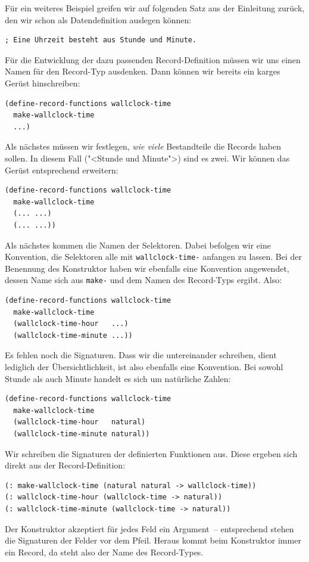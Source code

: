 Für ein weiteres Beispiel greifen wir auf folgenden Satz aus der
Einleitung zurück, den wir schon als Datendefinition auslegen können:
%
\begin{verbatim}
; Eine Uhrzeit besteht aus Stunde und Minute.
\end{verbatim}
%
Für die Entwicklung der dazu passenden Record-Definition müssen wir
uns einen Namen für den Record-Typ ausdenken.  Dann können wir bereits
ein karges Gerüst hinschreiben:
%
\begin{verbatim}
(define-record-functions wallclock-time
  make-wallclock-time
  ...)
\end{verbatim}
%
Als nächstes müssen wir festlegen, \emph{wie viele} Bestandteile die
Records haben sollen.  In diesem Fall ("<Stunde und Minute">) sind es
zwei.  Wir können das Gerüst entsprechend erweitern:
%
\begin{verbatim}
(define-record-functions wallclock-time
  make-wallclock-time
  (... ...)
  (... ...))
\end{verbatim}
%
Als nächstes kommen die Namen der Selektoren.  Dabei befolgen wir eine
Konvention, die Selektoren alle mit \texttt{wallclock-time-} anfangen
zu lassen.  Bei der Benennung des Konstruktor haben wir ebenfalls
eine Konvention angewendet, dessen Name sich aus \texttt{make-} und
dem Namen des Record-Typs ergibt.  Also:
%
\begin{verbatim}
(define-record-functions wallclock-time
  make-wallclock-time
  (wallclock-time-hour   ...)
  (wallclock-time-minute ...))
\end{verbatim}
%
Es fehlen noch die Signaturen.  Dass wir die untereinander schreiben,
dient lediglich der Übersichtlichkeit, ist also ebenfalls eine
Konvention.  Bei sowohl Stunde als auch Minute handelt es sich um
natürliche Zahlen:
%
\begin{verbatim}
(define-record-functions wallclock-time
  make-wallclock-time
  (wallclock-time-hour   natural)
  (wallclock-time-minute natural))
\end{verbatim}
%
Wir schreiben die Signaturen der definierten Funktionen aus.  Diese
ergeben sich direkt aus der Record-Definition:
%
\begin{verbatim}
(: make-wallclock-time (natural natural -> wallclock-time))
(: wallclock-time-hour (wallclock-time -> natural))
(: wallclock-time-minute (wallclock-time -> natural))
\end{verbatim}
%
Der Konstruktor akzeptiert für jedes Feld ein Argument~-- entsprechend
stehen die Signaturen der Felder vor dem Pfeil.  Heraus kommt beim
Konstruktor immer ein Record, da steht also der Name des Record-Types.

